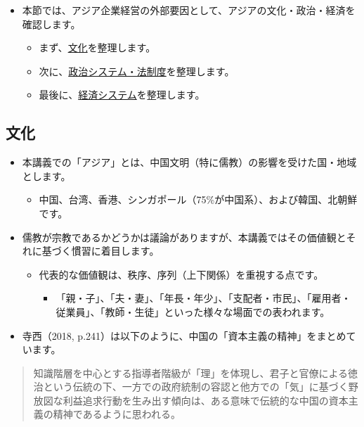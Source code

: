 \documentclass[
]{book}
\providecommand{\tightlist}{%
  \setlength{\itemsep}{0pt}\setlength{\parskip}{0pt}}
\begin{document}
\begin{itemize}
\item
  本節では、アジア企業経営の外部要因として、アジアの文化・政治・経済を確認します。

  \begin{itemize}
  \item
    まず、\protect\hyperlink{asia-culture}{文化}を整理します。
  \item
    次に、\protect\hyperlink{asia-politics}{政治システム・法制度}を整理します。
  \item
    最後に、\protect\hyperlink{asia-economy}{経済システム}を整理します。
  \end{itemize}
\end{itemize}

\hypertarget{asia-culture}{%
\subsection{文化}\label{asia-culture}}

\begin{itemize}
\item
  本講義での「アジア」とは、中国文明（特に儒教）の影響を受けた国・地域とします。

  \begin{itemize}
  \tightlist
  \item
    中国、台湾、香港、シンガポール（75\%が中国系）、および韓国、北朝鮮です。
  \end{itemize}
\item
  儒教が宗教であるかどうかは議論がありますが、本講義ではその価値観とそれに基づく慣習に着目します。

  \begin{itemize}
  \item
    代表的な価値観は、秩序、序列（上下関係）を重視する点です。

    \begin{itemize}
    \tightlist
    \item
      「親・子」、「夫・妻」、「年長・年少」、「支配者・市民」、「雇用者・従業員」、「教師・生徒」といった様々な場面での表われます。
    \end{itemize}
  \end{itemize}
\item
  寺西（2018, p.241）は以下のように、中国の「資本主義の精神」をまとめています。
\end{itemize}

\begin{quote}
知識階層を中心とする指導者階級が「理」を体現し、君子と官僚による徳治という伝統の下、一方での政府統制の容認と他方での「気」に基づく野放図な利益追求行動を生み出す傾向は、ある意味で伝統的な中国の資本主義の精神であるように思われる。
\end{quote}
\end{document}
